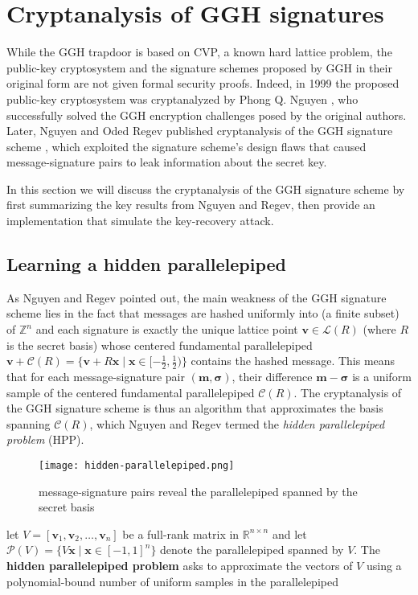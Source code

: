 \section{Cryptanalysis of GGH signatures}
While the GGH trapdoor is based on CVP, a known hard lattice problem, the public-key cryptosystem and the signature schemes proposed by GGH in their original form are not given formal security proofs. Indeed, in 1999 the proposed public-key cryptosystem was cryptanalyzed by Phong Q. Nguyen \cite{nguyen1999cryptanalysis}, who successfully solved the GGH encryption challenges posed by the original authors. Later, Nguyen and Oded Regev published cryptanalysis of the GGH signature scheme \cite{nguyen2006learning}, which exploited the signature scheme's design flaws that caused message-signature pairs to leak information about the secret key.

In this section we will discuss the cryptanalysis of the GGH signature scheme by first summarizing the key results from Nguyen and Regev, then provide an implementation that simulate the key-recovery attack.

\subsection{Learning a hidden parallelepiped}
As Nguyen and Regev pointed out, the main weakness of the GGH signature scheme lies in the fact that messages are hashed uniformly into (a finite subset) of $\mathbb{Z}^n$ and each signature is exactly the unique lattice point $\mathbf{v} \in \mathcal{L}(R)$ (where $R$ is the secret basis) whose centered fundamental parallelepiped $\mathbf{v} + \mathcal{C}(R) = \{\mathbf{v} + R\mathbf{x} \mid \mathbf{x} \in [-\frac{1}{2}, \frac{1}{2})\}$ contains the hashed message. This means that for each message-signature pair $(\mathbf{m}, \mathbf{\sigma})$, their difference $\mathbf{m} - \mathbf{\sigma}$ is a uniform sample of the centered fundamental parallelepiped $\mathcal{C}(R)$. The cryptanalysis of the GGH signature scheme is thus an algorithm that approximates the basis spanning $\mathcal{C}(R)$, which Nguyen and Regev termed the \textit{hidden parallelepiped problem} (HPP).

\begin{figure}[h]
    \centering
    \texttt{[image: hidden-parallelepiped.png]}
    \caption{message-signature pairs reveal the parallelepiped spanned by the secret basis}
\end{figure}

\begin{definition}
    let $V = [\mathbf{v}_1, \mathbf{v}_2, \ldots, \mathbf{v}_n]$ be a full-rank matrix in $\mathbb{R}^{n \times n}$ and let $\mathcal{P}(V) = \{V\mathbf{x} \mid \mathbf{x} \in [-1, 1]^n\}$ denote the parallelepiped spanned by $V$. The \textbf{hidden parallelepiped problem} asks to approximate the vectors of $V$ using a polynomial-bound number of uniform samples in the parallelepiped
\end{definition}

